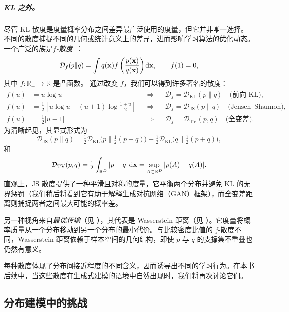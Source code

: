 \subparagraph{KL 之外。}尽管 KL 散度是度量概率分布之间差异最广泛使用的度量，但它并非唯一选择。不同的散度捕捉不同的几何或统计意义上的差异，进而影响学习算法的优化动态。一个广泛的族是\emph{$f$-散度}~\citep{csiszar1963informationstheoretische}：
\begin{align}\label{eq:f-div}
    \mathcal{D}_f(p\|q)
=\int q({\mathbf{x}}) f \left(\frac{p({\mathbf{x}})}{q({\mathbf{x}})}\right)\mathop{}\!\mathrm{d} {\mathbf{x}},
    \qquad f(1)=0,
\end{align}
其中 $f:\mathbb{R}_+ \to\mathbb{R}$ 是凸函数。
通过改变 $f$，我们可以得到许多著名的散度：
\[
\begin{aligned}
f(u)&=u\log u &&\Rightarrow&& \mathcal{D}_f=\mathcal{D}_{\mathrm{KL}}(p\|q)\quad\text{(前向 KL)},\\
f(u)&=\tfrac12 \left[u\log u-(u+1)\log \tfrac{1+u}{2}\right] &&\Rightarrow&& \mathcal{D}_f=\mathcal{D}_{\mathrm{JS}}(p\|q)\quad\text{(Jensen--Shannon)},\\
f(u)&=\tfrac12|u-1| &&\Rightarrow&& \mathcal{D}_f=\mathcal{D}_{\mathrm{TV}}(p,q)\quad\text{(全变差)}.
\end{aligned}
\]
为清晰起见，其显式形式为
\[
\mathcal{D}_{\mathrm{JS}}(p\|q)=\tfrac12 \mathcal{D}_{\mathrm{KL}}\big(p\| \tfrac12(p+q)\big)+\tfrac12 \mathcal{D}_{\mathrm{KL}}\big(q\| \tfrac12(p+q)\big),
\]
和
\[
\mathcal{D}_{\mathrm{TV}}(p,q)=\tfrac12 \int_{\mathbb{R}^D
} |p-q|\mathop{}\!\mathrm{d} {\mathbf{x}}
=\sup_{A\subset \mathbb{R}^D } |p(A)-q(A)|.
\]
直观上，JS 散度提供了一种平滑且对称的度量，它平衡两个分布并避免 KL 的无界惩罚（我们稍后将看到它有助于解释生成对抗网络（GAN）框架），而全变差距离则捕捉两者之间最大可能的概率差。


另一种视角来自\emph{最优传输}（见 ），其代表是 Wasserstein 距离（见 ）。它度量将概率质量从一个分布移动到另一个分布的最小代价。与比较密度比值的 $f$-散度不同，Wasserstein 距离依赖于样本空间的几何结构，即使 $p$ 与 $q$ 的支撑集不重叠也仍然有意义。

每种散度体现了分布间接近程度的不同含义，因而诱导出不同的学习行为。在本书后续中，当这些散度在生成式建模的语境中自然出现时，我们将再次讨论它们。






\subsection{分布建模中的挑战}

